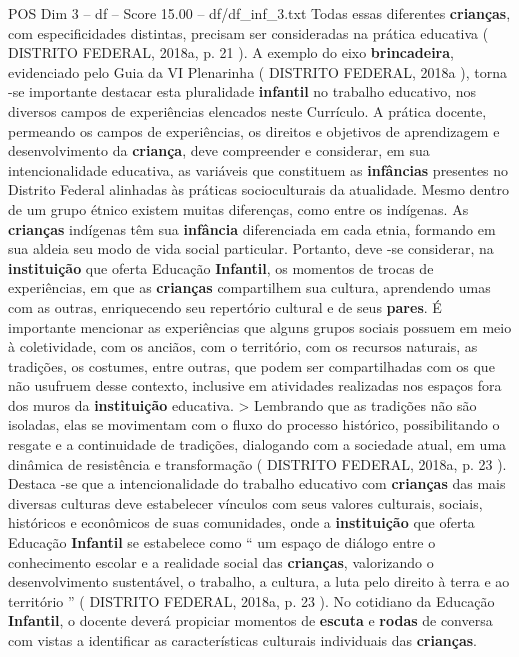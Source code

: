 \begin{textsample}{POS Dim 3 – df – Score 15.00 – df/df\_inf\_3.txt}
Todas essas diferentes \textbf{crianças}, com especificidades distintas, precisam ser consideradas na prática educativa ( DISTRITO FEDERAL, 2018a, p. 21 ).
A exemplo do eixo \textbf{brincadeira}, evidenciado pelo Guia da VI Plenarinha ( DISTRITO FEDERAL, 2018a ), torna -se importante destacar esta pluralidade \textbf{infantil} no trabalho educativo, nos diversos campos de experiências elencados neste Currículo.
A prática docente, permeando os campos de experiências, os direitos e objetivos de aprendizagem e desenvolvimento da \textbf{criança}, deve compreender e considerar, em sua intencionalidade educativa, as variáveis que constituem as \textbf{infâncias} presentes no Distrito Federal alinhadas às práticas socioculturais da atualidade.
Mesmo dentro de um grupo étnico existem muitas diferenças, como entre os indígenas.
As \textbf{crianças} indígenas têm sua \textbf{infância} diferenciada em cada etnia, formando em sua aldeia seu modo de vida social particular.
Portanto, deve -se considerar, na \textbf{instituição} que oferta Educação \textbf{Infantil}, os momentos de trocas de experiências, em que as \textbf{crianças} compartilhem sua cultura, aprendendo umas com as outras, enriquecendo seu repertório cultural e de seus \textbf{pares}.
É importante mencionar as experiências que alguns grupos sociais possuem em meio à coletividade, com os anciãos, com o território, com os recursos naturais, as tradições, os costumes, entre outras, que podem ser compartilhadas com os que não usufruem desse contexto, inclusive em atividades realizadas nos espaços fora dos muros da \textbf{instituição} educativa. > Lembrando que as tradições não são isoladas, elas se movimentam com o fluxo do processo histórico, possibilitando o resgate e a continuidade de tradições, dialogando com a sociedade atual, em uma dinâmica de resistência e transformação ( DISTRITO FEDERAL, 2018a, p. 23 ).
Destaca -se que a intencionalidade do trabalho educativo com \textbf{crianças} das mais diversas culturas deve estabelecer vínculos com seus valores culturais, sociais, históricos e econômicos de suas comunidades, onde a \textbf{instituição} que oferta Educação \textbf{Infantil} se estabelece como “ um espaço de diálogo entre o conhecimento escolar e a realidade social das \textbf{crianças}, valorizando o desenvolvimento sustentável, o trabalho, a cultura, a luta pelo direito à terra e ao território ” ( DISTRITO FEDERAL, 2018a, p. 23 ).
No cotidiano da Educação \textbf{Infantil}, o docente deverá propiciar momentos de \textbf{escuta} e \textbf{rodas} de conversa com vistas a identificar as características culturais individuais das \textbf{crianças}.

\end{textsample}
